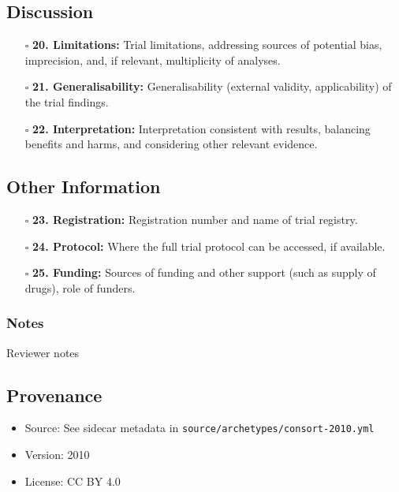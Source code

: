 \documentclass[11pt]{article}
\def\tightlist{}
\begin{document}
\begin{Form}
\subsection{Discussion}\label{discussion}

\begin{itemize}
\tightlist
\item[$\square$]
  \textbf{20. Limitations:} Trial limitations, addressing sources of
  potential bias, imprecision, and, if relevant, multiplicity of
  analyses.
\item[$\square$]
  \textbf{21. Generalisability:} Generalisability (external validity,
  applicability) of the trial findings.
\item[$\square$]
  \textbf{22. Interpretation:} Interpretation consistent with results,
  balancing benefits and harms, and considering other relevant evidence.
\end{itemize}

\subsection{Other Information}\label{other-information}

\begin{itemize}
\tightlist
\item[$\square$]
  \textbf{23. Registration:} Registration number and name of trial
  registry.
\item[$\square$]
  \textbf{24. Protocol:} Where the full trial protocol can be accessed,
  if available.
\item[$\square$]
  \textbf{25. Funding:} Sources of funding and other support (such as
  supply of drugs), role of funders.
\end{itemize}

\subsubsection{Notes}\label{notes}

{Reviewer notes}

\subsection{Provenance}\label{provenance}

\begin{itemize}
\tightlist
\item
  Source: See sidecar metadata in
  \texttt{source/archetypes/consort-2010.yml}
\item
  Version: 2010
\item
  License: CC BY 4.0
\end{itemize}

\end{Form}
\end{document}

